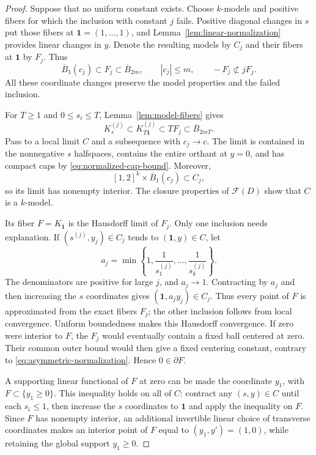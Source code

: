\begin{proof}
Suppose that no uniform constant exists.  Choose $k$-models and
positive fibers for which the inclusion with constant $j$ fails.
Positive diagonal changes in $s$ put those fibers at
$\mathbf1=(1,\ldots,1)$, and Lemma~\ref{lem:linear-normalization}
provides linear changes in $y$.  Denote the resulting models by
$C_j$ and their fibers at $\mathbf1$ by $F_j$.  Thus
\begin{equation}\label{eq:asymmetric-normalization}
 \overline B_1(c_j)\subset F_j\subset\overline B_{2m},
 \qquad |c_j|\le m,
 \qquad -F_j\not\subset jF_j.
\end{equation}
All these coordinate changes preserve the model properties and
the failed inclusion.

For $T\ge1$ and $0\le s_i\le T$,
Lemma~\ref{lem:model-fibers} gives
\begin{equation}\label{eq:normalized-cap-bound}
 K_s^{(j)}\subset K_{T\mathbf1}^{(j)}
 \subset T F_j\subset\overline B_{2mT}.
\end{equation}
Pass to a local limit $C$ and a subsequence with $c_j\to c$.
The limit is contained in the nonnegative $s$ halfspaces, contains
the entire orthant at $y=0$, and has compact caps by
\eqref{eq:normalized-cap-bound}.  Moreover,
\[
 [1,2]^k\times\overline B_1(c_j)\subset C_j,
\]
so its limit has nonempty interior.  The closure properties of
$\mathcal F(D)$ show that $C$ is a $k$-model.

Its fiber $F=K_{\mathbf1}$ is the Hausdorff limit of $F_j$.
Only one inclusion needs explanation.  If
$(s^{(j)},y_j)\in C_j$ tends to $(\mathbf1,y)\in C$, let
\[
 a_j=\min\left\{1,\frac1{s^{(j)}_1},\ldots,
                         \frac1{s^{(j)}_k}\right\}.
\]
The denominators are positive for large $j$, and $a_j\to1$.
Contracting by $a_j$ and then increasing the $s$ coordinates gives
$(\mathbf1,a_jy_j)\in C_j$.  Thus every point of $F$ is approximated
from the exact fibers $F_j$; the other inclusion follows from local
convergence.  Uniform boundedness makes this Hausdorff convergence.
If zero were interior to $F$, the $F_j$ would eventually contain a
fixed ball centered at zero.  Their common outer bound would then
give a fixed centering constant, contrary to
\eqref{eq:asymmetric-normalization}.  Hence $0\in\partial F$.

A supporting linear functional of $F$ at zero can be made the
coordinate $y_1$, with $F\subset\{y_1\ge0\}$.  This inequality
holds on all of $C$: contract any $(s,y)\in C$ until each $s_i\le1$,
then increase the $s$ coordinates to $\mathbf1$ and apply the
inequality on $F$.  Since $F$ has nonempty interior, an additional
invertible linear choice of transverse coordinates makes an
interior point of $F$ equal to $(y_1,y')=(1,0)$, while retaining
the global support $y_1\ge0$.


\end{proof}
